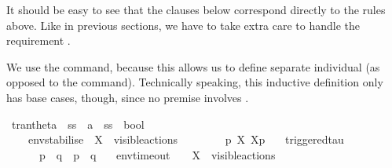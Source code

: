 \begin{isabellebody}
\begin{isamarkuptext}
It should be easy to see that the clauses below correspond directly to the rules above. Like in previous sections, we have to take extra care to handle the requirement .

We use the  command, because this allows us to define separate individual (as opposed to the  command). Technically speaking, this inductive definition only has base cases, though, since no premise involves \isa{{\isasymlongmapsto}\isactrlsup {\isasymtheta}}.%
\end{isamarkuptext}\isamarkuptrue%
\isamarkupfalse%
\ tran{\isacharunderscore}{\kern0pt}theta\ {\isacharcolon}{\kern0pt}{\isacharcolon}{\kern0pt}\ {\isacartoucheopen}{\isacharprime}{\kern0pt}ss\ {\isasymRightarrow}\ {\isacharprime}{\kern0pt}a\ {\isasymRightarrow}\ {\isacharprime}{\kern0pt}ss\ {\isasymRightarrow}\ bool{\isacartoucheclose}\ \isanewline
\ \ {\isacharparenleft}{\kern0pt}{\isacartoucheopen}{\isacharunderscore}{\kern0pt}\ {\isasymlongmapsto}\isactrlsup {\isasymtheta}{\isacharunderscore}{\kern0pt}\ {\isacharunderscore}{\kern0pt}{\isacartoucheclose}\ {\isacharbrackleft}{\kern0pt}{}{}{\isacharcomma}{\kern0pt}\ {}{}{\isacharcomma}{\kern0pt}\ {}{}{\isacharbrackright}{\kern0pt}\ {}{}{\isacharparenright}{\kern0pt}\isanewline
\ \ \ \isanewline
\ \ \ \ env{\isacharunderscore}{\kern0pt}stabilise{\isacharcolon}{\kern0pt}\ \ {\isacartoucheopen}X\ {\isasymsubseteq}\ visible{\isacharunderscore}{\kern0pt}actions\ {\isasymLongrightarrow}\ \isanewline
\ \ \ \ \ \ {\isasymtheta}{\isacharparenleft}{\kern0pt}p{\isacharparenright}{\kern0pt}\ {\isasymlongmapsto}\isactrlsup {\isasymtheta}{\isasymepsilon}{\isacharbrackleft}{\kern0pt}X{\isacharbrackright}{\kern0pt}\ {\isasymtheta}{\isacharbrackleft}{\kern0pt}X{\isacharbrackright}{\kern0pt}{\isacharparenleft}{\kern0pt}p{\isacharparenright}{\kern0pt}{\isacartoucheclose}\isanewline
\ \ {\isacharbar}{\kern0pt}\ triggered{\isacharunderscore}{\kern0pt}tau{\isacharcolon}{\kern0pt}\ \ \isanewline
\ \ \ \ \ \ {\isacartoucheopen}p\ {\isasymlongmapsto}{\isasymtau}\ q\ {\isasymLongrightarrow}\ {\isasymtheta}{\isacharparenleft}{\kern0pt}p{\isacharparenright}{\kern0pt}\ {\isasymlongmapsto}\isactrlsup {\isasymtheta}{\isasymtau}\ {\isasymtheta}{\isacharparenleft}{\kern0pt}q{\isacharparenright}{\kern0pt}{\isacartoucheclose}\isanewline
\ \ {\isacharbar}{\kern0pt}\ env{\isacharunderscore}{\kern0pt}timeout{\isacharcolon}{\kern0pt}\ \ \ \ {\isacartoucheopen}X\ {\isasymsubseteq}\ visible{\isacharunderscore}{\kern0pt}actions\ {\isasymLongrightarrow}\ \isanewline

\end{isabellebody}
